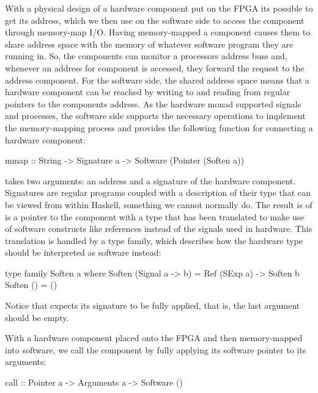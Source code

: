 \documentclass[../main.tex]{subfiles}
\begin{document}
With a physical design of a hardware component put on the FPGA its possible to get its address, which we then use on the software side to access the component through memory-map I/O. Having memory-mapped a component causes them to share address space with the memory of whatever software program they are running in. So, the components can monitor a processors address buss and, whenever an address for component is accessed, they forward the request to the address component. For the software side, the shared address space means that a hardware component can be reached by writing to and reading from regular pointers to the components address. As the hardware monad supported signals and processes, the software side supports the necessary operations to implement the memory-mapping process and provides the following function for connecting a hardware component:

\begin{code}
mmap :: String -> Signature a -> Software (Pointer (Soften a))
\end{code}

 takes two arguments: an address and a signature of the hardware component. Signatures are regular programs coupled with a description of their type that can be viewed from within Haskell, something we cannot normally do. The result is of  is a pointer to the component with a type that has been translated to make use of software constructs like references instead of the signals used in hardware. This translation is handled by a type family, which describes how the hardware type should be interpreted as software instead:

\begin{code}
type family Soften a where
  Soften (Signal a -> b) = Ref (SExp a) -> Soften b
  Soften ()              = ()
\end{code}

\noindent Notice that  expects its signature to be fully applied, that is, the last argument should be empty.

With a hardware component placed onto the FPGA and then memory-mapped into software, we call the component by fully applying its software pointer to its arguments:

\begin{code}
call :: Pointer a -> Arguments a -> Software ()
\end{code}
\end{document}
